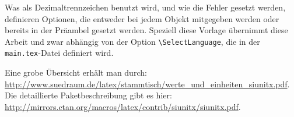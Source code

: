 Was als Dezimaltrennzeichen benutzt wird, und wie die Fehler gesetzt werden, definieren Optionen, die entweder bei jedem Objekt mitgegeben werden oder bereits in der Präambel gesetzt werden. Speziell diese Vorlage übernimmt diese Arbeit und zwar abhängig von der Option \verb|\SelectLanguage|, die in der \verb|main.tex|-Datei definiert wird.

Eine grobe Übersicht erhält man durch: \url{http://www.suedraum.de/latex/stammtisch/werte_und_einheiten_siunitx.pdf}. Die detaillierte Paketbeschreibung gibt es hier: \url{http://mirrors.ctan.org/macros/latex/contrib/siunitx/siunitx.pdf}.

